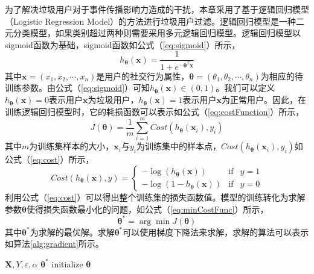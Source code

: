 为了解决垃圾用户对于事件传播影响力造成的干扰，本章采用了基于逻辑回归模型（Logistic Regression Model）的方法进行垃圾用户过滤。逻辑回归模型是一种二元分类模型，如果类别超过两种则需要采用多元逻辑回归模型。逻辑回归模型以sigmoid函数为基础，sigmoid函数如公式（\ref{eq:sigmoid}）所示，
\begin{equation}
\label{eq:sigmoid}
	h_ {\bm{\theta}} \left(\mathbf{x}\right) = \frac{1}{1 + e^{-{{\bm{\theta}}^T}\mathbf{x}}}
\end{equation}
其中$\mathbf{x}=\left({x_1},{x_2},\cdots,{x_n}\right)$是用户的社交行为属性，$\bm{\theta}=\left({\theta _1},{\theta _2},\cdots,{\theta _n}\right)$为相应的待训练参数。由公式（\ref{eq:sigmoid}）可知$h_ {\bm{\theta}} \left(\mathbf{x}\right) \in \left(0,1\right)$。我们可以定义$h_ {\bm{\theta}} \left(\mathbf{x}\right) = 0$表示用户$\mathbf{x}$为垃圾用户，$h_ {\bm{\theta}} \left(\mathbf{x}\right) = 1$表示用户$\mathbf{x}$为正常用户。因此，在训练逻辑回归模型时，它的耗损函数可以表示如公式（\ref{eq:costFunction}）所示，
\begin{equation}
\label{eq:costFunction}
	J\left(\bm{\theta}\right) = \frac{1}{m}\sum_{i=1}^m {Cost\left( h_ {\bm{\theta}}\left(\mathbf{x}_i\right), y_i\right)}
\end{equation}
其中$m$为训练集样本的大小，$\mathbf{x}_i$与$y_i$为训练集中的样本点，$Cost\left( h_ {\bm{\theta}}\left(\mathbf{x}_i\right), y_i\right)$如公式（\ref{eq:cost}）所示，
\begin{equation}
\label{eq:cost}
	Cost\left( h_ {\bm{\theta}}\left(\mathbf{x}\right), y\right) = \left\{ \begin{array}{rcl} -\log \left(h_ {\bm{\theta}} \left(\mathbf{x}\right)\right) & \mbox{if} & y=1 \\ -\log \left(1 - h_ {\bm{\theta}} \left(\mathbf{x}\right) \right) & \mbox{if} & y=0  \end{array} \right.
\end{equation}
利用公式（\ref{eq:cost}）可以得出整个训练集的损失函数值。模型的训练转化为求解参数$\bm{\theta}$使得损失函数最小化的问题，如公式（\ref{eq:minCostFunc}）所示，
\begin{equation}
\label{eq:minCostFunc}
	\bm{\theta}^{\ast} = \arg\min{J\left(\bm{\theta}\right)}
\end{equation}
其中$\bm{\theta}^{\ast}$为求解的最优解。求解$\bm{\theta}^{\ast}$可以使用梯度下降法来求解，求解的算法可以表示如算法\ref{alg:gradient}所示。
\begin{algorithm}[!ht]
	\caption{$Gradient(\mathbf{X},Y)$}
	\label{alg:gradient}
	\begin{algorithmic}[1]
	\REQUIRE $\mathbf{X},Y,\varepsilon,\alpha$
	\ENSURE $\bm{\theta}^{\ast}$
	\STATE initialize $\bm{\theta}$
	\ENDWHILE
    \end{algorithmic}
\end{algorithm}

